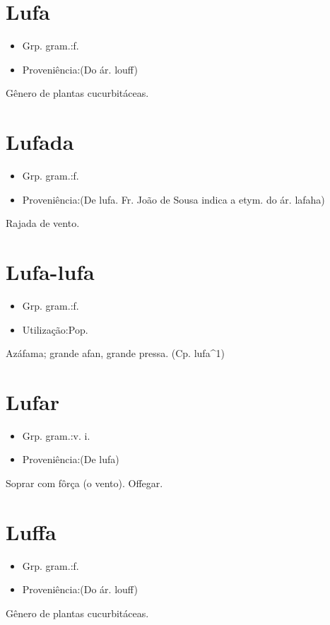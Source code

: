 \section{Lufa}
\begin{itemize}
\item {Grp. gram.:f.}
\end{itemize}
\begin{itemize}
\item {Proveniência:(Do ár. \textunderscore louff\textunderscore )}
\end{itemize}
Gênero de plantas cucurbitáceas.
\section{Lufada}
\begin{itemize}
\item {Grp. gram.:f.}
\end{itemize}
\begin{itemize}
\item {Proveniência:(De \textunderscore lufa\textunderscore . Fr. João de Sousa indica a etym. do ár. \textunderscore lafaha\textunderscore )}
\end{itemize}
Rajada de vento.
\section{Lufa-lufa}
\begin{itemize}
\item {Grp. gram.:f.}
\end{itemize}
\begin{itemize}
\item {Utilização:Pop.}
\end{itemize}
Azáfama; grande afan, grande pressa.
(Cp. \textunderscore lufa\textunderscore ^1)
\section{Lufar}
\begin{itemize}
\item {Grp. gram.:v. i.}
\end{itemize}
\begin{itemize}
\item {Proveniência:(De lufa)}
\end{itemize}
Soprar com fôrça (o vento).
Offegar.
\section{Luffa}
\begin{itemize}
\item {Grp. gram.:f.}
\end{itemize}
\begin{itemize}
\item {Proveniência:(Do ár. \textunderscore louff\textunderscore )}
\end{itemize}
Gênero de plantas cucurbitáceas.
